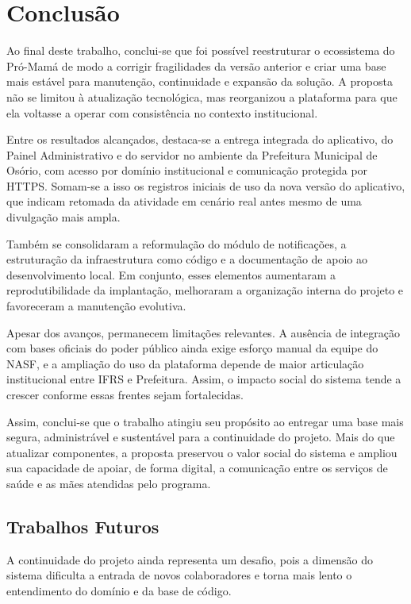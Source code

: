 \chapter{Conclusão}

Ao final deste trabalho, conclui-se que foi possível reestruturar o ecossistema
do Pró-Mamá de modo a corrigir fragilidades da versão anterior e criar uma base
mais estável para manutenção, continuidade e expansão da solução. A proposta não
se limitou à atualização tecnológica, mas reorganizou a plataforma para que ela
voltasse a operar com consistência no contexto institucional.

Entre os resultados alcançados, destaca-se a entrega integrada do aplicativo, do
Painel Administrativo e do servidor no ambiente da Prefeitura Municipal de
Osório, com acesso por domínio institucional e comunicação protegida por HTTPS.
Somam-se a isso os registros iniciais de uso da nova versão do aplicativo, que
indicam retomada da atividade em cenário real antes mesmo de uma divulgação mais
ampla.

Também se consolidaram a reformulação do módulo de notificações, a
estruturação da infraestrutura como código e a documentação de apoio ao
desenvolvimento local. Em conjunto, esses elementos aumentaram a
reprodutibilidade da implantação, melhoraram a organização interna do projeto e
favoreceram a manutenção evolutiva.

Apesar dos avanços, permanecem limitações relevantes. A ausência de integração
com bases oficiais do poder público ainda exige esforço manual da equipe do
NASF, e a ampliação do uso da plataforma depende de maior articulação
institucional entre IFRS e Prefeitura. Assim, o impacto social do sistema tende
a crescer conforme essas frentes sejam fortalecidas.

Assim, conclui-se que o trabalho atingiu seu propósito ao entregar uma base
mais segura, administrável e sustentável para a continuidade do projeto. Mais
do que atualizar componentes, a proposta preservou o valor social do sistema e
ampliou sua capacidade de apoiar, de forma digital, a comunicação entre os
serviços de saúde e as mães atendidas pelo programa.

\section{Trabalhos Futuros}

A continuidade do projeto ainda representa um desafio, pois a dimensão
do sistema dificulta a entrada de novos colaboradores e torna mais
lento o entendimento do domínio e da base de código.


